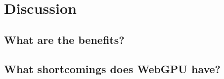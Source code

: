 \chapter{Discussion}
\label{cha:Discussion}

\section{What are the benefits?}
\section{What shortcomings does WebGPU have?}